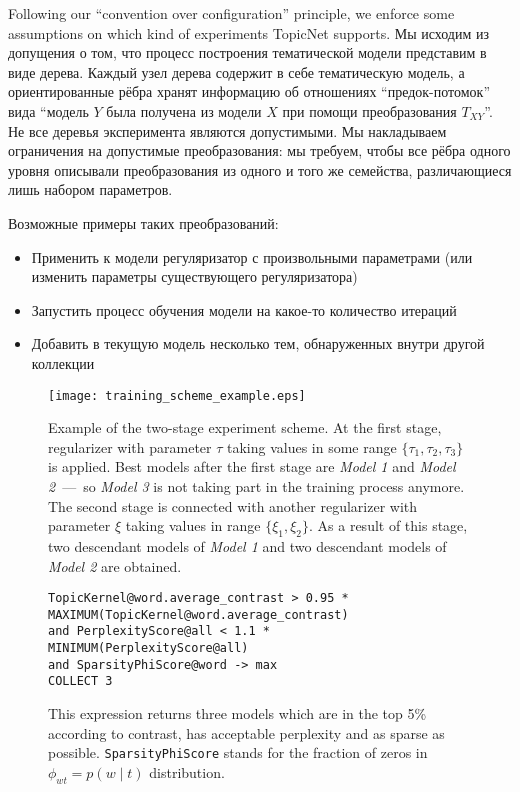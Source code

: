 Following our ``convention over configuration'' principle, we enforce some assumptions on which kind of experiments TopicNet supports. 
Мы исходим из допущения о том, что процесс построения тематической модели представим в виде дерева. Каждый узел дерева содержит в себе тематическую модель, а ориентированные рёбра хранят информацию об отношениях ``предок-потомок'' вида ``модель $Y$ была получена из модели $X$ при помощи преобразования $T_{XY}$''. Не все деревья эксперимента являются допустимыми. Мы накладываем ограничения на допустимые преобразования: мы требуем, чтобы все рёбра одного уровня описывали преобразования из одного и того же семейства, различающиеся лишь набором параметров. 

Возможные примеры таких преобразований:

\begin{itemize}
    \item Применить к модели регуляризатор с произвольными параметрами (или изменить параметры существующего регуляризатора)
    \item Запустить процесс обучения модели на какое-то количество итераций
    \item Добавить в текущую модель несколько тем, обнаруженных внутри другой коллекции
\end{itemize}

\begin{figure}[t]
    \centering
    \texttt{[image: training\_scheme\_example.eps]}
    \caption{
        Example of the two-stage experiment scheme.
        At the first stage, regularizer with parameter $\tau$ taking values in some range $\{\tau_1, \tau_2, \tau_3\}$ is applied.
        Best models after the first stage are \emph{Model 1} and \emph{Model 2}~---~so \emph{Model 3} is not taking part in the training process anymore.
        The second stage is connected with another regularizer with parameter $\xi$ taking values in range $\{\xi_1, \xi_2\}$.
        As a result of this stage, two descendant models of \emph{Model 1} and two descendant models of \emph{Model 2} are obtained.
    }
\label{Training-scheme}
\end{figure}

\begin{figure*}[!ht]
\footnotesize
\texttt{TopicKernel@word.average\_contrast > 0.95 * MAXIMUM(TopicKernel@word.average\_contrast) \\
\hphantom{\ \ } and PerplexityScore@all < 1.1 * MINIMUM(PerplexityScore@all) \\
\hphantom{\ \ } and SparsityPhiScore@word -> max\\
\hphantom{\ \ } COLLECT 3}
\caption{This expression returns three models which are in the top 5\% according to contrast, has acceptable perplexity and as sparse as possible. \texttt{SparsityPhiScore} stands for the fraction of zeros in $\phi_{wt} = p(w \mid t)$ distribution.}
\label{DSL-example}
\end{figure*}


